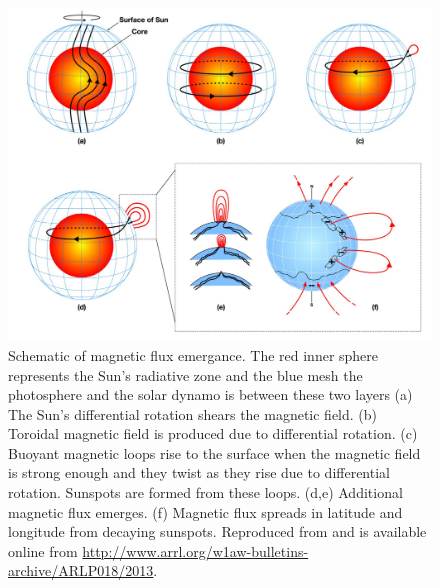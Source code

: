 	\begin{figure}
		\centering
		\includegraphics[width=\textwidth]{dynamo.pdf}
		\caption{
				 Schematic of magnetic flux emergance.
				 The red inner sphere represents the Sun's radiative zone and the blue mesh the photosphere and the solar dynamo is between these two layers
				 (a) The Sun's differential rotation shears the magnetic field.
				 (b) Toroidal magnetic field is produced due to differential rotation.
				 (c) Buoyant magnetic loops rise to the surface when the magnetic field is strong enough and they twist as they rise due to differential rotation.
				 Sunspots are formed from these loops.
				 (d,e) Additional magnetic flux emerges. 
				 (f) Magnetic flux spreads in latitude and longitude from decaying sunspots.
			     Reproduced from \cite{1367-2630-9-8-297} and is available online from \url{http://www.arrl.org/w1aw-bulletins-archive/ARLP018/2013}.
		        }
		\label{fig:dynamo_field}
	\end{figure}
			
